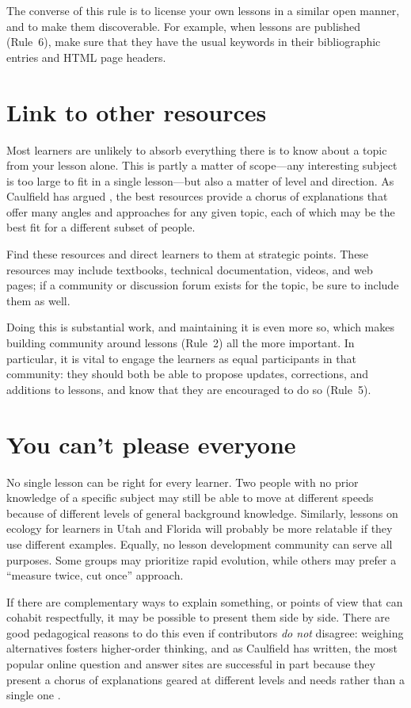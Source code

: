 \documentclass[10pt,letterpaper]{article}
\newcommand{\rulemajor}[1]{\section{#1}}
\begin{document}
The converse of this rule is to license your own lessons in a similar open manner,
and to make them discoverable.
For example,
when lessons are published (Rule~6),
make sure that they have the usual keywords in their bibliographic entries
and HTML page headers.

\rulemajor{Link to other resources}

Most learners are unlikely to absorb everything there is to know about a topic
from your lesson alone.
This is partly a matter of scope---any interesting subject is too large
to fit in a single lesson---but also a matter of level and direction.
As Caulfield has argued \cite{choral-explanations},
the best resources provide a chorus of explanations
that offer many angles and approaches for any given topic,
each of which may be the best fit for a different subset of people.

Find these resources and direct learners to them at strategic points.
These resources may include textbooks,
technical documentation,
videos,
and web pages;
if a community or discussion forum exists for the topic,
be sure to include them as well.

Doing this is substantial work,
and maintaining it is even more so,
which makes building community around lessons (Rule~2) all the more important.
In particular,
it is vital to engage the learners as equal participants in that community:
they should both be able to propose updates, corrections, and additions to lessons,
and know that they are encouraged to do so (Rule~5).

\rulemajor{You can't please everyone}

No single lesson can be right for every learner.
Two people with no prior knowledge of a specific subject
may still be able to move at different speeds
because of different levels of general background knowledge.
Similarly,
lessons on ecology for learners in Utah and Florida
will probably be more relatable if they use different examples.
Equally,
no lesson development community can serve all purposes.
Some groups may prioritize rapid evolution,
while others may prefer a ``measure twice, cut once'' approach.

If there are complementary ways to explain something,
or points of view that can cohabit respectfully,
it may be possible to present them side by side.
There are good pedagogical reasons to do this
even if contributors \emph{do not} disagree:
weighing alternatives fosters higher-order thinking,
and as Caulfield has written,
the most popular online question and answer sites
are successful in part because they present a chorus of explanations
geared at different levels and needs
rather than a single one \cite{choral-explanations}.
\end{document}

